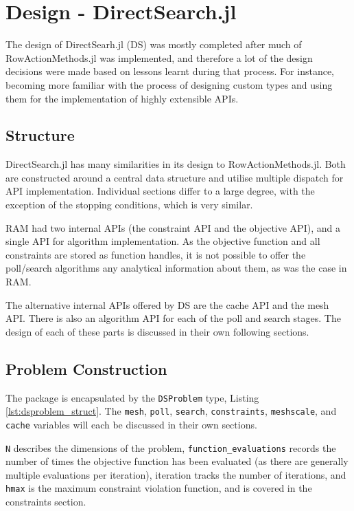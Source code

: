 \section{Design - DirectSearch.jl}\label{section_design_ds}
The design of DirectSearh.jl (DS) was mostly completed after much of RowActionMethods.jl was implemented, and therefore a lot of the design decisions were made based on lessons learnt during that process. For instance, becoming more familiar with the process of designing custom types and using them for the implementation of highly extensible APIs.


\subsection{Structure}

DirectSearch.jl has many similarities in its design to RowActionMethods.jl. Both are constructed around a central data structure and utilise multiple dispatch for API implementation. Individual sections differ to a large degree, with the exception of the stopping conditions, which is very similar.

RAM had two internal APIs (the constraint API and the objective API), and a single API for algorithm implementation. As the objective function and all constraints are stored as function handles, it is not possible to offer the poll/search algorithms any analytical information about them, as was the case in RAM. 

The alternative internal APIs offered by DS are the cache API and the mesh API. There is also an algorithm API for each of the poll and search stages. The design of each of these parts is discussed in their own following sections. 

\subsection{Problem Construction}

The package is encapsulated by the \texttt{DSProblem} type, Listing \ref{lst:dsproblem_struct}. The \texttt{mesh}, \texttt{poll}, \texttt{search}, \texttt{constraints}, \texttt{meshscale}, and \texttt{cache} variables will each be discussed in their own sections. 

\texttt{N} describes the dimensions of the problem, \texttt{function\_evaluations} records the number of times the objective function has been evaluated (as there are generally multiple evaluations per iteration), iteration tracks the number of iterations, and \texttt{hmax} is the maximum constraint violation function, and is covered in the constraints section.


